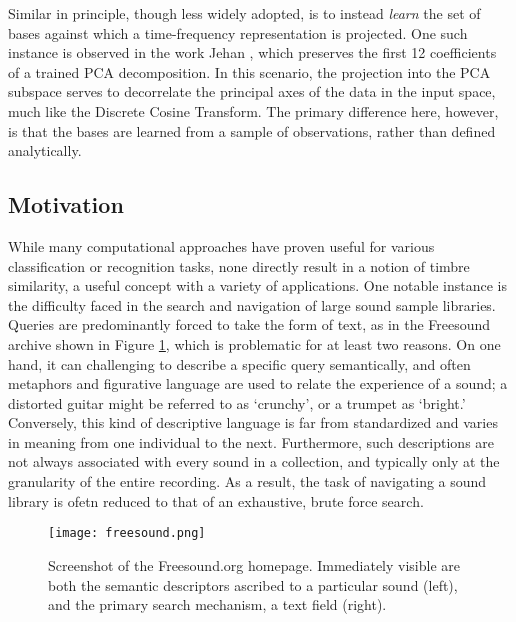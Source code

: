 Similar in principle, though less widely adopted, is to instead \emph{learn} the set of bases against which a time-frequency representation is projected.
One such instance is observed in the work Jehan \cite{Jehan2005}, which preserves the first 12 coefficients of a trained PCA decomposition.
In this scenario, the projection into the PCA subspace serves to decorrelate the principal axes of the data in the input space, much like the Discrete Cosine Transform.
The primary difference here, however, is that the bases are learned from a sample of observations, rather than defined analytically.



\subsection{Motivation}

While many computational approaches have proven useful for various classification or recognition tasks, none directly result in a notion of timbre similarity, a useful concept with a variety of applications.
One notable instance is the difficulty faced in the search and navigation of large sound sample libraries.
Queries are predominantly forced to take the form of text, as in the Freesound archive shown in
Figure \ref{fig:freesound}, which is problematic for at least two reasons.
On one hand, it can challenging to describe a specific query semantically, and often metaphors and figurative language are used to relate the experience of a sound; a distorted guitar might be referred to as `crunchy', or a trumpet as `bright.'
Conversely, this kind of descriptive language is far from standardized and varies in meaning from one individual to the next.
Furthermore, such descriptions are not always associated with every sound in a collection, and typically only at the granularity of the entire recording.
As a result, the task of navigating a sound library is ofetn reduced to that of an exhaustive, brute force search.

\begin{figure}[t]
\centering
\texttt{[image: freesound.png]}
\caption{Screenshot of the Freesound.org homepage. Immediately visible are both the semantic descriptors ascribed to a particular sound (left), and the primary search mechanism, a text field (right).}
\label{fig:freesound}
\end{figure}

